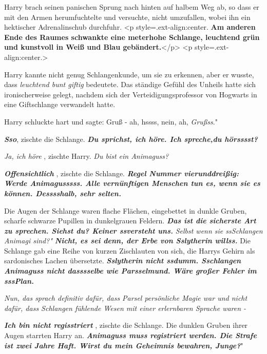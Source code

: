 Harry brach seinen panischen Sprung nach hinten auf halbem Weg ab, so dass er
mit den Armen herumfuchtelte und versuchte, nicht umzufallen, wobei ihn ein
hektischer Adrenalinschub durchfuhr. <p style=\grqq{}.ext-align:center\grqq{}.
\textbf{ Am anderen Ende des Raumes schwankte eine meterhohe Schlange, leuchtend
grün und kunstvoll in Weiß und Blau gebändert.}</p> <p
style=\grqq{}.ext-align:center\grqq{}.>

Harry kannte nicht genug Schlangenkunde, um sie zu erkennen, aber er wusste,
dass \emph{ \glqq leuchtend bunt\grqq{} \glqq giftig\grqq{} } bedeutete. Das
ständige Gefühl des Unheils hatte sich ironischerweise gelegt, nachdem sich der
Verteidigungsprofessor von Hogwarts in eine Giftschlange verwandelt hatte.

Harry schluckte hart und sagte: \glqq Gruß - ah, hssss, nein, ah,
\emph{Grußss}."

\glqq \textbf{\emph{Sso}}\grqq{}, zischte die Schlange. \textbf{\emph{\glqq Du
sprichst, ich höre. Ich spreche,du hörsssst?\grqq{} }}

\emph{ \glqq Ja, ich höre\grqq{} }, zischte Harry. \emph{\glqq Du bist ein
Animaguss?\grqq{}}

\textbf{\emph{ \glqq Offensichtlich\grqq{} }}, zischte die Schlange.
\textbf{\emph{ \glqq Regel Nummer vierunddreißig: Werde Animagusssss. Alle
vernünftigen Menschen tun es, wenn sie es können. Desssshalb, sehr
selten.\grqq{} }}

Die Augen der Schlange waren flache Flächen, eingebettet in dunkle Gruben,
scharfe schwarze Pupillen in dunkelgrauen Feldern. \textbf{\emph{ \glqq Das ist
die sicherste Art zu sprechen. Siehst du? Keiner ssversteht uns.\grqq{} }}
\emph{ \glqq Selbst wenn sie ssSchlangen Animagi sind?" } \textbf{\emph{ \glqq
Nicht, es sei denn, der Erbe von Sslytherin willss.\grqq{} }} Die Schlange gab
eine Reihe von kurzen Zischlauten von sich, die Harrys Gehirn als sardonisches
Lachen übersetzte. \textbf{\emph{ \glqq Sslytherin nicht ssdumm. Sschlangen
Animaguss nicht dasssselbe wie Parsselmund. Wäre großer Fehler im
sssPlan.\grqq{} }}

\emph{ Nun, das sprach definitiv dafür, dass Parsel persönliche Magie war und nicht dafür, dass Schlangen fühlende Wesen mit einer erlernbaren Sprache waren -}

\textbf{\emph{ \glqq Ich bin nicht regisstriert\grqq{} }}, zischte die Schlange.
Die dunklen Gruben ihrer Augen starrten Harry an. \textbf{\emph{ \glqq Animaguss
muss registriert werden. Die Strafe ist zwei Jahre Haft. Wirst du mein Geheimnis
bewahren, Junge?}}"

